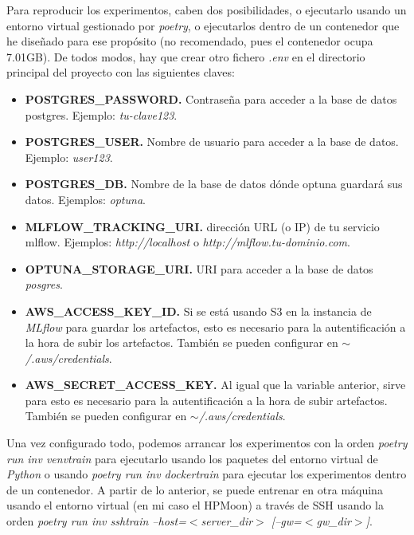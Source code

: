 Para reproducir los experimentos, caben dos posibilidades, o ejecutarlo usando un entorno virtual gestionado por \textit{poetry}, o ejecutarlos dentro de un contenedor que he diseñado para ese propósito (no recomendado, pues el contenedor ocupa 7.01GB). De todos modos, hay que crear otro fichero \textit{.env} en el directorio principal del proyecto con las siguientes claves:

\begin{itemize}
	\item \textbf{POSTGRES\_PASSWORD.} Contraseña para acceder a la base de datos postgres. Ejemplo: \textit{tu-clave123}.
	 \item \textbf{POSTGRES\_USER.} Nombre de usuario para acceder a la base de datos. Ejemplo: \textit{user123}.
	 \item \textbf{POSTGRES\_DB.} Nombre de la base de datos dónde optuna guardará sus datos. Ejemplos: \textit{optuna}.
	 \item \textbf{MLFLOW\_TRACKING\_URI.} dirección URL (o IP) de tu servicio mlflow. Ejemplos: \textit{http://localhost} o \textit{http://mlflow.tu-dominio.com}.
	 \item \textbf{OPTUNA\_STORAGE\_URI.} URI para acceder a la base de datos \textit{posgres}.
	 \item \textbf{AWS\_ACCESS\_KEY\_ID.} Si se está usando S3 en la instancia de \textit{MLflow} para guardar los artefactos, esto es necesario para la autentificación a la hora de subir los artefactos. También se pueden configurar en \textit{$\sim$/.aws/credentials}.
	 \item \textbf{AWS\_SECRET\_ACCESS\_KEY.} Al igual que la variable anterior, sirve para esto es necesario para la autentificación a la hora de subir artefactos. También se pueden configurar en \textit{$\sim$/.aws/credentials}.
\end{itemize}

Una vez configurado todo, podemos arrancar los experimentos con la orden \textit{poetry run inv venvtrain} para ejecutarlo usando los paquetes del entorno virtual de \textit{Python} o usando \textit{poetry run inv dockertrain} para ejecutar los experimentos dentro de un contenedor. A partir de lo anterior, se puede entrenar en otra máquina usando el entorno virtual (en mi caso el HPMoon) a través de SSH usando la orden \textit{poetry run inv sshtrain --host=$<$server\_dir$>$ [--gw=$<$gw\_dir$>$]}.\newline

